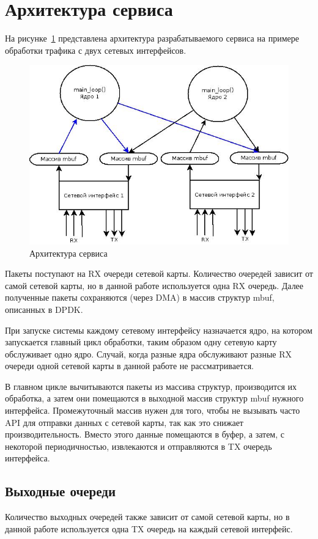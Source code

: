 \section{Архитектура сервиса}
На рисунке~\ref{pic:concept_schema} представлена архитектура разрабатываемого сервиса на примере обработки трафика с двух сетевых интерфейсов.
\begin{figure}[h]
\centering
\includegraphics[scale=0.6]{pictures/concept_schema}
\caption{Архитектура сервиса}
\label{pic:concept_schema}
\end{figure}

Пакеты поступают на RX очереди сетевой карты. Количество очередей зависит от самой сетевой карты, но в данной работе используется одна RX очередь. Далее полученные пакеты сохраняются (через DMA) в массив структур mbuf, описанных в DPDK.

При запуске системы каждому сетевому интерфейсу назначается ядро, на котором запускается главный цикл обработки, таким образом одну сетевую карту обслуживает одно ядро. Случай, когда разные ядра обслуживают разные RX очереди одной сетевой карты в данной работе не рассматривается.

В главном цикле вычитываются пакеты из массива структур, производится их обработка, а затем они помещаются  в выходной массив структур mbuf нужного интерфейса. Промежуточный массив нужен для того, чтобы не вызывать часто API для отправки данных с сетевой карты, так как это снижает производительность. Вместо этого данные помещаются в буфер, а затем, с некоторой периодичностью, извлекаются и отправляются в TX очередь интерфейса.

\subsection{Выходные очереди}
Количество выходных очередей также зависит от самой сетевой карты, но в данной работе используется одна TX очередь на каждый сетевой интерфейс.

